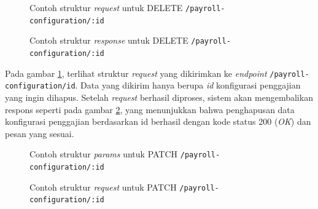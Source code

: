 \begin{figure}
    \centering
    \caption{Contoh struktur \textit{request} untuk DELETE \texttt{/payroll-configuration/{:id}}}
    \label{fig:request_payroll_configuration_by_id_delete}
\end{figure}
\begin{figure}
    \centering
    \caption{Contoh struktur \textit{response} untuk DELETE \texttt{/payroll-configuration/{:id}}}
    \label{fig:response_payroll_configuration_by_id_delete}
\end{figure}

Pada gambar \ref{fig:request_payroll_configuration_by_id_delete}, terlihat struktur \textit{request} yang dikirimkan ke \textit{endpoint} \texttt{/payroll-configuration/{id}}. Data yang dikirim hanya berupa \textit{id} konfigurasi penggajian yang ingin dihapus. Setelah \textit{request} berhasil diproses, sistem akan mengembalikan respons seperti pada gambar \ref{fig:response_payroll_configuration_by_id_delete}, yang menunjukkan bahwa penghapusan data konfigurasi penggajian berdasarkan id berhasil dengan kode status 200 (\textit{OK}) dan pesan yang sesuai.

\begin{figure}
    \centering
    \caption{Contoh struktur \textit{params} untuk PATCH \texttt{/payroll-configuration/{:id}}}
    \label{fig:request_payroll_configuration_by_id_patch}
\end{figure}

\begin{figure}
    \centering
    \caption{Contoh struktur \textit{request} untuk PATCH \texttt{/payroll-configuration/{:id}}}
    \label{fig:request_payroll_configuration_by_id_patch}
\end{figure}

